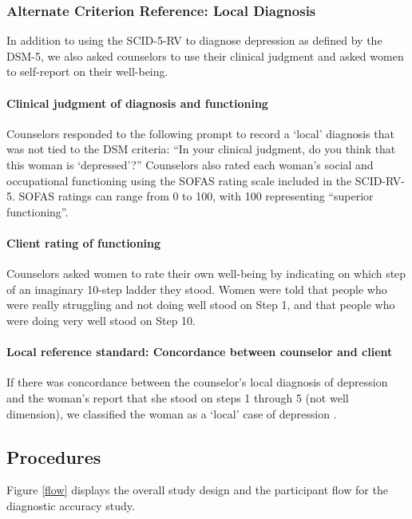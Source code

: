 \documentclass[man,natbib,longtable]{apa6}\usepackage[]{graphicx}\usepackage[]{color}
\begin{document}
\subsubsection{Alternate Criterion Reference: Local Diagnosis}

In addition to using the SCID-5-RV to diagnose depression as defined by the DSM-5, we also asked counselors to use their clinical judgment and asked women to self-report on their well-being.

\paragraph{Clinical judgment of diagnosis and functioning}

Counselors responded to the following prompt to record a `local' diagnosis that was not tied to the DSM criteria: ``In your clinical judgment, do you think that this woman is `depressed'?'' Counselors also rated each woman's social and occupational functioning using the SOFAS rating scale included in the SCID-RV-5. SOFAS ratings can range from 0 to 100, with 100 representing ``superior functioning''.

\paragraph{Client rating of functioning}

Counselors asked women to rate their own well-being by indicating on which step of an imaginary 10-step ladder they stood. Women were told that people who were really struggling and not doing well stood on Step 1, and that people who were doing very well stood on Step 10. 

\paragraph{Local reference standard: Concordance between counselor and client}

If there was concordance between the counselor's local diagnosis of depression and the woman's report that she stood on steps 1 through 5 (not well dimension), we classified the woman as a `local' case of depression \citep{Bolton:2001xc}.

\subsection{Procedures}

Figure \ref{flow} displays the overall study design and the participant flow for the diagnostic accuracy study.
\end{document}
